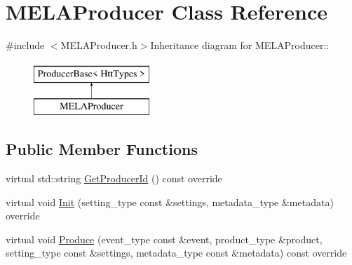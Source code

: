 \hypertarget{classMELAProducer}{
\section{MELAProducer Class Reference}
\label{classMELAProducer}
}


{\ttfamily \#include $<$MELAProducer.h$>$}Inheritance diagram for MELAProducer::\begin{figure}[H]
\begin{center}
\leavevmode
\includegraphics[height=2cm]{classMELAProducer}
\end{center}
\end{figure}
\subsection*{Public Member Functions}
\begin{DoxyCompactItemize}
\item 
virtual std::string \hyperlink{classMELAProducer_a7c01509443cf2a8b3c64347153c00abd}{GetProducerId} () const override
\item 
virtual void \hyperlink{classMELAProducer_abbf59864ab6d88fed3ae26fc01301f7f}{Init} (setting\_\-type const \&settings, metadata\_\-type \&metadata) override
\item 
virtual void \hyperlink{classMELAProducer_aa44138887fbffc7532695727226d068b}{Produce} (event\_\-type const \&event, product\_\-type \&product, setting\_\-type const \&settings, metadata\_\-type const \&metadata) const override
\end{DoxyCompactItemize}


